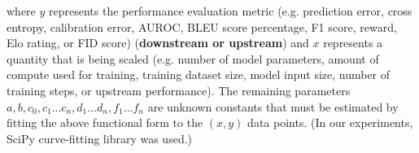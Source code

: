 \documentclass{article} %
\begin{document}
where $y$ represents the performance evaluation metric (e.g. prediction error, cross entropy, calibration error, AUROC, BLEU score percentage, F1 score, reward, Elo rating, or FID score) (\textbf{downstream or upstream}) and $x$ represents a quantity that is being scaled (e.g. number of model parameters, amount of compute used for training, training dataset size, model input size, number of training steps, or upstream performance). The remaining  parameters %
$a, b, c_0, c_1 ... c_n, d_1 ...  d_n, f_1 ... f_n$
are unknown constants that must be estimated by fitting the above functional form to the $(x,y)$ data points. (In our experiments,  SciPy curve-fitting library \citep{virtanen2020scipy} was used.) 

\end{document}
